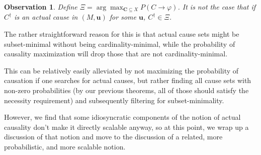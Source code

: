 \documentclass[anon,12pt]{clear2025} %
\newtheorem{observation}[theorem]{Observation}
\begin{document}
\begin{observation}\label{obs:misalignment} Define $\Xi = \arg\max_{\mathbf{C} \subseteq {X}} P(C \rightarrow \varphi)$. It is not the case that if $C^\dagger$ is an actual cause in $(M, \mathbf{u})$ for some $\mathbf{u}$, $C^\dagger \in \Xi$.
\end{observation}

The rather straightforward reason for this is that actual cause sets might be subset-minimal without being cardinality-minimal, while the probability of causality maximization will drop those that are not cardinality-minimal.

This can be relatively easily alleviated by not maximizing the probability of causation if one searches for actual causes, but rather finding all cause sets with non-zero probabilities (by our previous theorems, all of those should satisfy the necessity requirement) and subsequently filtering for subset-minimality.

However, we find that some idiosyncratic components of the notion of actual causality don't make it directly scalable anyway, so at this point, we wrap up a discussion of that notion and move to the discussion of a related, more probabilistic, and more scalable notion.









\end{document}
